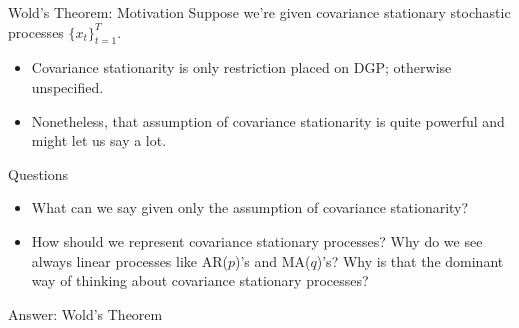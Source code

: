 \documentclass[aspectratio=169, handout]{beamer}
\begin{document}







{\footnotesize
\begin{frame}[shrink]{Wold's Theorem: Motivation}
Suppose we're \alert{given}
\alert{covariance stationary stochastic processes} $\{x_t\}_{t=1}^T$.
\begin{itemize}
  \item Covariance stationarity is \alert{only} restriction placed on
    DGP; otherwise unspecified.
  \item Nonetheless, that assumption of covariance stationarity is quite
    powerful and might let us say a lot.
\end{itemize}
Questions
\begin{itemize}
  \item What can we say given only the assumption of covariance stationarity?
  \item How should we \alert{represent} covariance stationary processes?
    Why do we see always linear processes like AR($p$)'s and MA($q$)'s?
    Why is that the dominant way of thinking about covariance stationary
    processes?
\end{itemize}
\alert{Answer}: Wold's Theorem
\end{frame}
}
\end{document}
